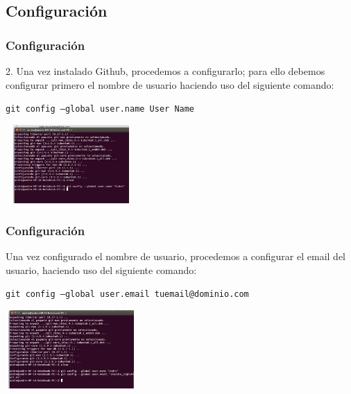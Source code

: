 \documentclass{beamer}
\begin{document}
\subsection{Configuración}
	\begin{frame}
			\frametitle{Configuración}
			2. Una vez instalado Github, procedemos a configurarlo; para ello debemos configurar primero el 								nombre de usuario haciendo uso del siguiente comando:\\
			\begin{center}
				 {\tt \scriptsize git config --global user.name User Name}\\
			\end{center}
			\begin{center}\includegraphics[width=5cm, height=3cm]{2.png}\end{center}
	\end{frame}
		
	\begin{frame}
			\frametitle{Configuración}
			Una vez configurado el nombre de usuario, procedemos a configurar el email del usuario, haciendo 						uso del siguiente comando:\\
			\begin{center}
				 {\tt \scriptsize git config --global user.email tuemail@dominio.com}\\
			\end{center}
			\begin{center}\includegraphics[width=5cm, height=3cm]{3.png}\end{center}
	\end{frame}
\end{document}
